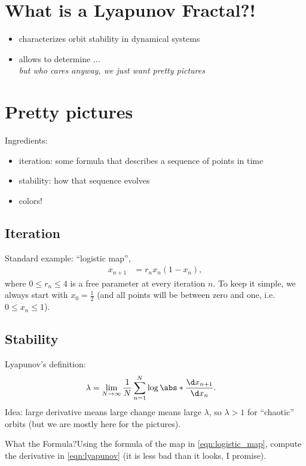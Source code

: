 \documentclass[english,landscape]{article}
\begin{document}
\newpage
\begin{minipage}[c]{0.4\pagewidth}
\section{What is a Lyapunov Fractal?!}
\begin{itemize}
\item characterizes orbit stability in dynamical systems
\item allows to determine ...\\ \emph{but who cares anyway, we just want pretty pictures}
\end{itemize}
\section{Pretty pictures}
Ingredients:
\begin{itemize}
\item iteration: some formula that describes a sequence of points in time
\item stability: how that sequence evolves
\item colors!
\end{itemize}
\subsection{Iteration}
Standard example: \enquote{logistic map},
\begin{align}
x_{n+1} &= r_n x_n (1-x_n), \label{eqn:logistic_map}
\end{align}
where $0\le r_n \le 4$ is a free parameter at every iteration $n$.
To keep it simple, we always start with $x_0=\frac{1}{2}$ (and all points will be between zero and one, i.e. $0\le x_n \le 1$).
\subsection{Stability}
Lyapunov's definition:
\begin{align}
\lambda &= \lim_{N\rightarrow \infty} \frac{1}{N} \sum_{n=1}^{N} \log \abs*{\frac{\d x_{n+1}}{\d x_n}} \label{eqn:lyapunov}.
\end{align}
Idea: large derivative means large change means large $\lambda$, so $\lambda > 1$ for \enquote{chaotic} orbits (but we are mostly here for the pictures).
\begin{taskbox}{What the Formula?}Using the formula of the map in \autoref{eqn:logistic_map}, compute the derivative in \autoref{eqn:lyapunov} (it is less bad than it looks, I promise).
\end{taskbox}
\end{minipage}%
\end{document}
